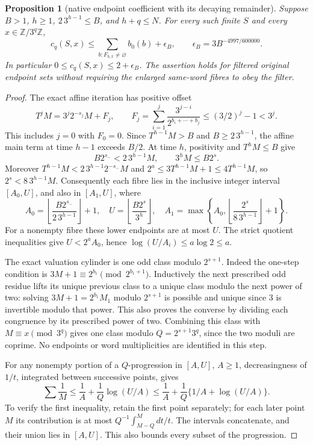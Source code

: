 \documentclass[11pt]{article}
\newtheorem{proposition}{Proposition}
\theoremstyle{remark}\newtheorem{remark}[proposition]{Remark}
\begin{document}
\begin{proposition}[native endpoint coefficient with its decaying remainder]
\label{prop:mazur-native-coefficient}
Suppose $B>1$, $h\ge1$, $2\,3^{h-1}\le B$, and $h+q\le N$.
For every such finite $S$ and every $x\in\mathbb Z/3^q\mathbb Z$,
\begin{equation}
 c_q(S,x)\le\sum_{b:F_{b,x}\ne\varnothing}b_0(b)
             +\epsilon_B,\qquad
 \epsilon_B=3B^{-4997/600000}.
 \label{eq:mazur-native-coefficient}
\end{equation}
In particular $0\le c_q(S,x)\le2+\epsilon_B$.
The assertion holds for filtered original endpoint sets without
requiring the enlarged same-word fibres to obey the filter.
\end{proposition}
\begin{proof}
The exact affine iteration has positive offset
\[
 T^jM=3^j2^{-s_j}M+F_j,\qquad
 F_j=\sum_{i=1}^j\frac{3^{j-i}}{2^{b_i+\cdots+b_j}}
 \le(3/2)^j-1<3^j .
\]
This includes $j=0$ with $F_0=0$.
Since $T^{h-1}M>B$ and $B\ge2\,3^{h-1}$, the affine main term
at time $h-1$ exceeds $B/2$. At time $h$, positivity and
$T^hM\le B$ give
\[
 B2^{s_-}<2\,3^{h-1}M,\qquad 3^hM\le B2^s .
\]
Moreover $T^{h-1}M<2\,3^{h-1}2^{-s_-}M$ and
$2^a\le3T^{h-1}M+1\le4T^{h-1}M$, so
$2^s<8\,3^{h-1}M$. Consequently each fibre lies in the inclusive
integer interval $[A_0,U]$, and also in $[A_1,U]$, where
\[
 A_0=\left\lfloor\frac{B2^{s_-}}{2\,3^{h-1}}\right\rfloor+1,\quad
 U=\left\lfloor\frac{B2^s}{3^h}\right\rfloor,\quad
 A_1=\max\left\{A_0,\left\lfloor\frac{2^s}{8\,3^{h-1}}\right\rfloor+1\right\}.
\]
For a nonempty fibre these lower endpoints are at most $U$.
The strict quotient inequalities give $U<2^aA_0$, hence
$\log(U/A_i)\le a\log2\le a$.

The exact valuation cylinder is one odd class modulo $2^{s+1}$.
Indeed the one-step condition is $3M+1\equiv2^{b_1}\pmod{2^{b_1+1}}$.
Inductively the next prescribed odd residue lifts its unique previous
class to a unique class modulo the next power of two: solving
$3M+1=2^{b_1}M_1$ modulo $2^{s+1}$ is possible and unique since
$3$ is invertible modulo that power. This also proves the converse
by dividing each congruence by its prescribed power of two.
Combining this class with $M\equiv x\pmod{3^q}$ gives one class
modulo $Q=2^{s+1}3^q$, since the two moduli are coprime.
No endpoints or word multiplicities are identified in this step.

For any nonempty portion of a $Q$-progression in $[A,U]$, $A\ge1$,
decreasingness of $1/t$, integrated between successive points, gives
\[
 \sum\frac1M\le\frac1A+\frac1Q\log(U/A)
 \le\frac1A+\frac1Q\{1/A+\log(U/A)\}.
\]
To verify the first inequality, retain the first point separately;
for each later point $M$ its contribution is at most
$Q^{-1}\int_{M-Q}^M dt/t$. The intervals concatenate, and their
union lies in $[A,U]$. This also bounds every subset of the progression.


\end{proof}
\end{document}
